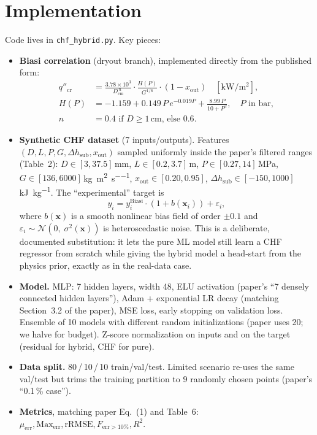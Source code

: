 \documentclass[11pt,a4paper]{article}
\begin{document}
\section{Implementation}
Code lives in \texttt{chf\_hybrid.py}.  Key pieces:
\begin{itemize}[leftmargin=1.2em]
\item \textbf{Biasi correlation} (dryout branch), implemented directly
from the published form:
\begin{align*}
q''_{\text{cr}} &= \frac{3.78\times10^3}{D_\text{cm}^{\,n}}
   \cdot \frac{H(P)}{G^{1/6}}\cdot(1-x_{\text{out}})\quad[\si{\kilo\watt\per\meter\squared}],\\
H(P) &= -1.159 + 0.149\,P\,e^{-0.019 P} + \frac{8.99\,P}{10+P^2},\quad P\text{ in bar},\\
n &= 0.4 \text{ if }D\ge 1\,\text{cm, else }0.6.
\end{align*}
\item \textbf{Synthetic CHF dataset} (7 inputs/outputs). Features
$(D, L, P, G, \Delta h_{\text{sub}}, x_{\text{out}})$ sampled uniformly
inside the paper's filtered ranges (Table~2): $D\in[3,37.5]$\,mm,
$L\in[0.2,3.7]$\,m, $P\in[0.27,14]$\,MPa,
$G\in[136,6000]$\,\si{\kilo\gram\per\meter\squared\per\second},
$x_{\text{out}}\in[0.20,0.95]$, $\Delta h_{\text{sub}}\in[-150,1000]$\,\si{\kilo\joule\per\kilo\gram}.
The ``experimental'' target is
\[
y_i = y^{\text{Biasi}}_i \cdot (1 + b(\mathbf{x}_i)) + \varepsilon_i,
\]
where $b(\mathbf{x})$ is a smooth nonlinear bias field of order
$\pm 0.1$ and $\varepsilon_i \sim \mathcal{N}(0,\;\sigma^2(\mathbf{x}))$
is heteroscedastic noise.  This is a deliberate, documented
substitution: it lets the pure ML model still learn a CHF regressor
from scratch while giving the hybrid model a head-start from the
physics prior, exactly as in the real-data case.
\item \textbf{Model.}  MLP: 7 hidden layers, width 48, ELU activation
(paper's ``7 densely connected hidden layers''), Adam + exponential
LR decay (matching Section~3.2 of the paper), MSE loss, early stopping
on validation loss.  Ensemble of 10 models with different random
initializations (paper uses 20; we halve for budget).  Z-score
normalization on inputs and on the target (residual for hybrid, CHF
for pure).
\item \textbf{Data split.}  80\,/\,10\,/\,10 train/val/test.  Limited
scenario re-uses the same val/test but trims the training partition to
9 randomly chosen points (paper's ``0.1\,\% case'').
\item \textbf{Metrics}, matching paper Eq.~(1) and Table~6:
$\mu_{\text{err}}, \text{Max}_{\text{err}}, \text{rRMSE}, F_{\text{err}>10\%},
R^2$.
\end{itemize}
\end{document}
